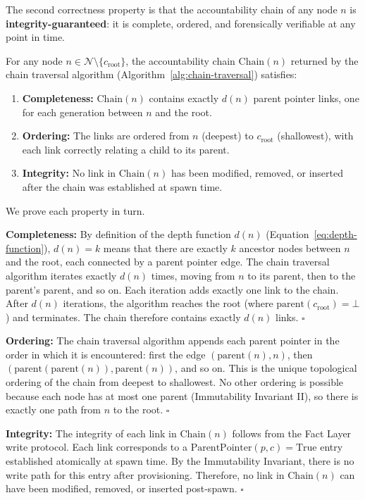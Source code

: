 The second correctness property is that the accountability chain of any node $n$ is \textbf{integrity-guaranteed}: it is complete, ordered, and forensically verifiable at any point in time.

\begin{thrm}
\label{thrm:chain-integrity}
For any node $n \in \mathcal{N} \setminus \{c_{\text{root}}\}$, the accountability chain $\text{Chain}(n)$ returned by the chain traversal algorithm (Algorithm~\ref{alg:chain-traversal}) satisfies:
\begin{enumerate}
\item \textbf{Completeness:} $\text{Chain}(n)$ contains exactly $d(n)$ parent pointer links, one for each generation between $n$ and the root.
\item \textbf{Ordering:} The links are ordered from $n$ (deepest) to $c_{\text{root}}$ (shallowest), with each link correctly relating a child to its parent.
\item \textbf{Integrity:} No link in $\text{Chain}(n)$ has been modified, removed, or inserted after the chain was established at spawn time.
\end{enumerate}
\end{thrm}

\begin{Proof}
We prove each property in turn.

\medskip
\textbf{Completeness:} By definition of the depth function $d(n)$ (Equation~\ref{eq:depth-function}), $d(n) = k$ means that there are exactly $k$ ancestor nodes between $n$ and the root, each connected by a parent pointer edge. The chain traversal algorithm iterates exactly $d(n)$ times, moving from $n$ to its parent, then to the parent's parent, and so on. Each iteration adds exactly one link to the chain. After $d(n)$ iterations, the algorithm reaches the root (where $\text{parent}(c_{\text{root}}) = \bot$) and terminates. The chain therefore contains exactly $d(n)$ links. $\square$

\medskip
\textbf{Ordering:} The chain traversal algorithm appends each parent pointer in the order in which it is encountered: first the edge $(\text{parent}(n), n)$, then $(\text{parent}(\text{parent}(n)), \text{parent}(n))$, and so on. This is the unique topological ordering of the chain from deepest to shallowest. No other ordering is possible because each node has at most one parent (Immutability Invariant II), so there is exactly one path from $n$ to the root. $\square$

\medskip
\textbf{Integrity:} The integrity of each link in $\text{Chain}(n)$ follows from the Fact Layer write protocol. Each link corresponds to a $\text{ParentPointer}(p, c) = \text{True}$ entry established atomically at spawn time. By the Immutability Invariant, there is no write path for this entry after provisioning. Therefore, no link in $\text{Chain}(n)$ can have been modified, removed, or inserted post-spawn. $\square$

\end{Proof}

